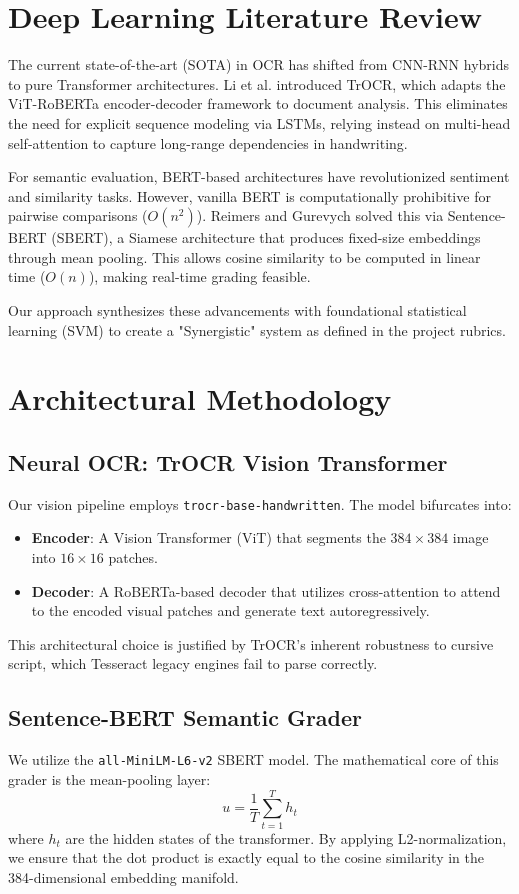 \documentclass[conference]{IEEEtran}
\begin{document}
\section{Deep Learning Literature Review}
The current state-of-the-art (SOTA) in OCR has shifted from CNN-RNN hybrids to pure Transformer architectures. Li et al. \cite{li2021} introduced TrOCR, which adapts the ViT-RoBERTa encoder-decoder framework to document analysis. This eliminates the need for explicit sequence modeling via LSTMs, relying instead on multi-head self-attention to capture long-range dependencies in handwriting.

For semantic evaluation, BERT-based architectures have revolutionized sentiment and similarity tasks. However, vanilla BERT is computationally prohibitive for pairwise comparisons ($O(n^2)$). Reimers and Gurevych \cite{reimers2019} solved this via Sentence-BERT (SBERT), a Siamese architecture that produces fixed-size embeddings through mean pooling. This allows cosine similarity to be computed in linear time ($O(n)$), making real-time grading feasible.

Our approach synthesizes these advancements with foundational statistical learning (SVM) to create a "Synergistic" system as defined in the project rubrics.

\section{Architectural Methodology}
\subsection{Neural OCR: TrOCR Vision Transformer}
Our vision pipeline employs \texttt{trocr-base-handwritten}. The model bifurcates into:
\begin{itemize}
    \item \textbf{Encoder}: A Vision Transformer (ViT) that segments the $384 \times 384$ image into $16 \times 16$ patches.
    \item \textbf{Decoder}: A RoBERTa-based decoder that utilizes cross-attention to attend to the encoded visual patches and generate text autoregressively.
\end{itemize}
This architectural choice is justified by TrOCR's inherent robustness to cursive script, which Tesseract legacy engines fail to parse correctly.

\subsection{Sentence-BERT Semantic Grader}
We utilize the \texttt{all-MiniLM-L6-v2} SBERT model. The mathematical core of this grader is the mean-pooling layer:
\begin{equation}
u = \frac{1}{T} \sum_{t=1}^T h_t
\end{equation}
where $h_t$ are the hidden states of the transformer. By applying L2-normalization, we ensure that the dot product is exactly equal to the cosine similarity in the 384-dimensional embedding manifold.
\end{document}
